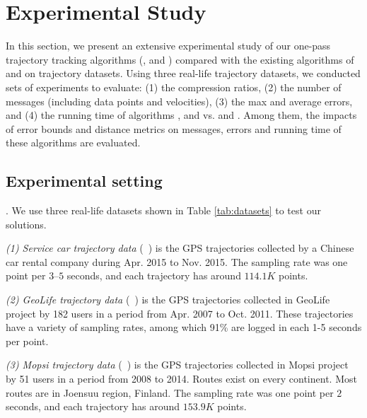 \section{Experimental Study}
\label{sec-exp}



In this section, we present an extensive experimental study of our one-pass trajectory tracking algorithms (\citt, \sitt and \bitt) compared with the
existing algorithms of \ldrh and \grts on trajectory datasets. Using three real-life trajectory datasets, we conducted sets of experiments to evaluate:
(1) the compression ratios,
(2) the number of messages (including data points and velocities),
(3) the max and average errors, and
(4) the running time of algorithms \citt, \sitt and \bitt vs. \ldrh and \grts. 
Among them, the impacts of error bounds and distance metrics on messages, errors and running time of these algorithms are evaluated. 


\subsection{Experimental setting}

. We use three real-life datasets shown in Table \ref{tab:datasets} to test our solutions.

\vspace{0.5ex}
\ni \emph{(1) Service car trajectory data} (\sercar~\cite{Lin:Cised}) is the GPS trajectories collected by a Chinese car rental company during Apr. 2015 to Nov. 2015. The sampling rate was one point per $3$--$5$ seconds, and
each trajectory has around $114.1K$ points.

\vspace{0.5ex}
\ni \emph{(2) GeoLife trajectory data} (\geolife~\cite{Web:GeoLife}) is the GPS trajectories collected in GeoLife project by 182 users in a period from Apr. 2007 to Oct. 2011. These trajectories have a variety of sampling rates, among which 91\% are logged in each 1-5 seconds per point. %

\vspace{0.5ex}
\ni \emph{(3) Mopsi trajectory data} (\mopsi~\cite{Web:Mopsi}) is the GPS trajectories collected in Mopsi project by 51 users in a period from 2008 to 2014. Routes exist on every continent. Most routes are in Joensuu region, Finland.
The sampling rate was one point per $2$ seconds, and each trajectory has around $153.9K$ points.

